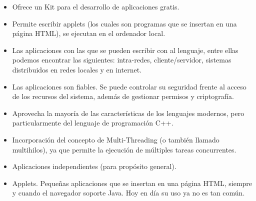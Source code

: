 \begin{itemize}
	\item Ofrece un Kit para el  desarrollo de aplicaciones gratis.
	\item Permite escribir applets (los cuales son programas que se insertan 
		en una página HTML), se ejecutan en el ordenador local.
	\item Las aplicaciones con las que se pueden escribir con al lenguaje, 
		entre ellas podemos encontrar las siguientes: intra-redes, 
		cliente/servidor, sistemas distribuidos en redes locales y en 
		internet.
	\item Las aplicaciones son fiables. Se puede controlar su seguridad 
		frente al acceso de los recursos del sistema, además de 
		gestionar permisos y criptografía.
	\item Aprovecha la mayoría de las características de los lenguajes 
		modernos, pero particularmente del lenguaje de programación C++.
	\item Incorporación del concepto de Multi-Threading (o también llamado 
		multihilos), ya que permite la ejecución de múltiples tareas 
		concurrentes.
	\item Aplicaciones independientes (para propósito general).
	\item Applets. Pequeñas aplicaciones que se insertan en una página HTML, 
		siempre y cuando el navegador soporte Java. Hoy en día su uso ya 
		no es tan común.
\end{itemize}

